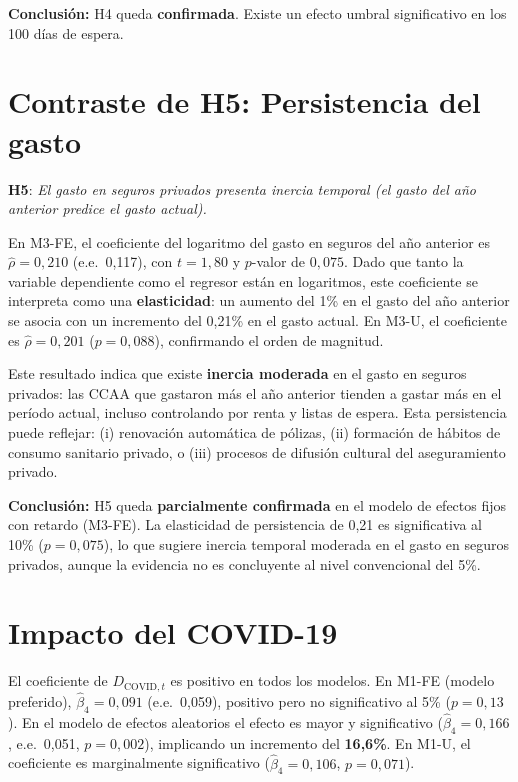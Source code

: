 \textbf{Conclusión:} H4 queda \textbf{confirmada}. Existe un efecto umbral
significativo en los 100 días de espera.

\section{Contraste de H5: Persistencia del gasto}
\label{sec:h5}

\textbf{H5}: \textit{El gasto en seguros privados presenta inercia temporal
(el gasto del año anterior predice el gasto actual).}

En M3-FE, el coeficiente del logaritmo del gasto en seguros del año anterior es
$\hat{\rho} = 0{,}210$ (e.e.\ 0{,}117), con $t = 1{,}80$ y $p$-valor de
$0{,}075$. Dado que tanto la variable dependiente como el regresor están en
logaritmos, este coeficiente se interpreta como una \textbf{elasticidad}: un
aumento del 1\% en el gasto del año anterior se asocia con un incremento del
0{,}21\% en el gasto actual. En M3-U, el coeficiente es $\hat{\rho} = 0{,}201$
($p = 0{,}088$), confirmando el orden de magnitud.

Este resultado indica que existe \textbf{inercia moderada} en el gasto en
seguros privados: las CCAA que gastaron más el año anterior tienden a gastar
más en el período actual, incluso controlando por renta y listas de espera.
Esta persistencia puede reflejar: (i) renovación automática de pólizas,
(ii) formación de hábitos de consumo sanitario privado, o (iii) procesos de
difusión cultural del aseguramiento privado.

\textbf{Conclusión:} H5 queda \textbf{parcialmente confirmada} en el modelo de
efectos fijos con retardo (M3-FE). La elasticidad de persistencia de 0{,}21
es significativa al 10\% ($p = 0{,}075$), lo que sugiere inercia temporal
moderada en el gasto en seguros privados, aunque la evidencia no es concluyente
al nivel convencional del 5\%.

\section{Impacto del COVID-19}
\label{sec:covid}

El coeficiente de $D_{\text{COVID},t}$ es positivo en todos los modelos. En
M1-FE (modelo preferido), $\hat{\beta}_4 = 0{,}091$ (e.e.\ 0{,}059), positivo
pero no significativo al 5\% ($p = 0{,}13$). En el modelo de efectos aleatorios
el efecto es mayor y significativo ($\hat{\beta}_4 = 0{,}166$, e.e.\ 0{,}051,
$p = 0{,}002$), implicando un incremento del \textbf{16{,}6\%}. En M1-U, el
coeficiente es marginalmente significativo ($\hat{\beta}_4 = 0{,}106$,
$p = 0{,}071$).

